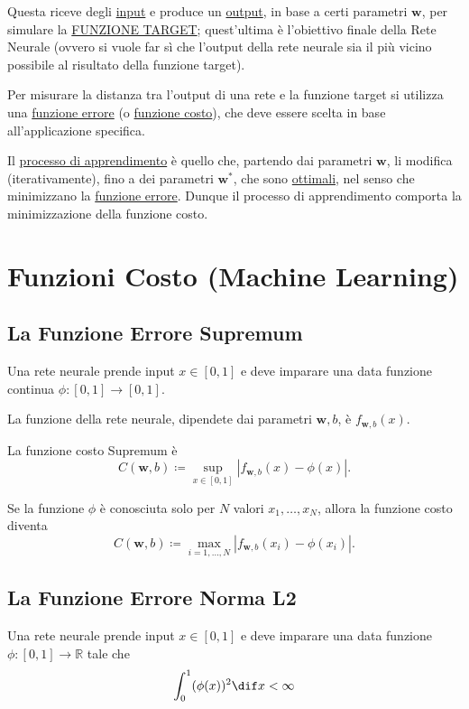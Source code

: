 \documentclass[10pt]{book}
\newcommand{\1}{\mathds{1}}
\newcommand{\R}{\mathds{R}}
\theoremstyle{definition}%
\theoremstyle{plain}
\theoremstyle{remark}
\begin{document}
Questa riceve degli \uline{input} e produce un \uline{output}, in base a certi parametri \(\bm{w}\), per simulare la \uline{FUNZIONE TARGET}; quest'ultima è l'obiettivo finale della Rete Neurale (ovvero si vuole far sì che l'output della rete neurale sia il più vicino possibile al risultato della funzione target).

Per misurare la distanza tra l'output di una rete e la funzione target si utilizza una \uline{funzione errore} (o \uline{funzione costo}), che deve essere scelta in base all'applicazione specifica.

Il \uline{processo di apprendimento} è quello che, partendo dai parametri \(\bm{w}\), li modifica (iterativamente), fino a dei parametri \(\bm{w}^{*}\), che sono \uline{ottimali}, nel senso che minimizzano la \uline{funzione errore}. Dunque il processo di apprendimento comporta la minimizzazione della funzione costo.
\section{Funzioni Costo (Machine Learning)}
\label{sec:orge28f52f}
\subsection{La Funzione Errore Supremum}
\label{sec:org86499c1}

Una rete neurale prende input \(x \in [0,1]\) e deve imparare una data funzione continua \(\phi:[0,1]\to [0,1]\).

La funzione della rete neurale, dipendete dai parametri \(\bm{w},b\), è \(f_{\bm{w},b}(x)\).

La funzione costo Supremum è
\begin{equation*}
C(\bm{w},b) \coloneqq \sup_{x \in [0,1]}|f_{\bm{w},b}(x)-\phi(x)|.
\end{equation*}

Se la funzione \(\phi\) è conosciuta solo per \(N\) valori \(x_{1},\dots,x_{N}\), allora la funzione costo diventa
\begin{equation*}
C(\bm{w},b) \coloneqq \max_{i=1,\dots, N} |f_{\bm{w},b}(x_{i})-\phi(x_{i})|.
\end{equation*}
\subsection{La Funzione Errore Norma L2}
\label{sec:orgc19e927}

Una rete neurale prende input \(x \in [0,1]\) e deve imparare una data funzione \(\phi:[0,1]\to \R\) tale che
\begin{equation*}
\int_{0}^{1}(\phi(x))^{2}\dif x <\infty
\end{equation*}
\end{document}
